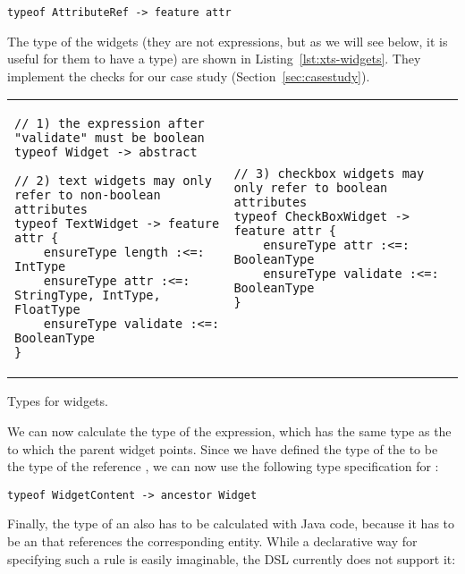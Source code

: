\begin{lstlisting}[language=xts]
typeof AttributeRef -> feature attr
\end{lstlisting}

The type of the widgets (they are not expressions, but as we will see below, it
is useful for them to have a type) are shown in Listing~\ref{lst:xts-widgets}.
They implement the checks for our case study (Section~\ref{sec:casestudy}).

\begin{listing}[tb]
\begin{tabular}{l@{\hspace{.5cm}}l}
\begin{lstlisting}[language=xts,boxpos=t] 
// 1) the expression after "validate" must be boolean
typeof Widget -> abstract

// 2) text widgets may only refer to non-boolean attributes 
typeof TextWidget -> feature attr {
    ensureType length :<=: IntType
    ensureType attr :<=: StringType, IntType, FloatType
    ensureType validate :<=: BooleanType
}  
\end{lstlisting}
&
\begin{lstlisting}[language=xts,boxpos=t] 
// 3) checkbox widgets may only refer to boolean attributes
typeof CheckBoxWidget -> feature attr {
    ensureType attr :<=: BooleanType
    ensureType validate :<=: BooleanType
}
\end{lstlisting}
\end{tabular}
\vspace{-3.5ex}
\caption{Types for widgets.}
\label{lst:xts-widgets}
\end{listing}

We can now calculate the type of the  expression, which has the
same type as the  to which the parent widget points. Since we have
defined the type of the  to be the type of the reference , we can
now use the following type specification for :

\begin{lstlisting}[language=xts]
typeof WidgetContent -> ancestor Widget
\end{lstlisting}

Finally, the type of an  also has to be calculated with Java code, because
it has to be an  that references the corresponding entity. While
a declarative way for specifying such a rule is easily imaginable, the DSL
currently does not support it:

